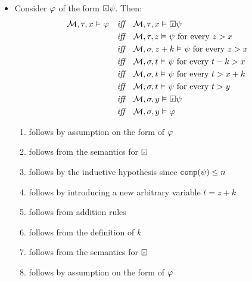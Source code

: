 \documentclass[a4paper, 11pt]{article}                  %
\begin{document}
\begin{enumerate}
{\begin{itemize}
          \item Consider $\varphi$ of the form $\Future\metaB$. Then:
          \setcounter{equation}{0}
          \begin{align}
            \M, \tau, x \MLmodels \metaA \quad \textit{iff}\quad & \M, \tau, x \MLmodels \Future\metaB\\
            \textit{iff}\quad & \M, \tau, z \MLmodels \metaB \text{ for every } z > x\\
            \textit{iff}\quad & \M, \sigma, z+k \MLmodels \metaB \text{ for every } z > x\\
            \textit{iff}\quad & \M, \sigma, t \MLmodels \metaB \text{ for every } t - k > x\\
            \textit{iff}\quad & \M, \sigma, t \MLmodels \metaB \text{ for every } t > x + k\\
            \textit{iff}\quad & \M, \sigma, t \MLmodels \metaB \text{ for every } t > y\\
            \textit{iff}\quad & \M, \sigma, y \MLmodels \Future\metaB\\
            \textit{iff}\quad & \M, \sigma, y \MLmodels \metaA
          \end{align}
          \begin{enumerate}[label=(\arabic*)]
            \item follows by assumption on the form of $\varphi$
            \item follows from the semantics for $\Future$
            \item follows by the inductive hypothesis since $\texttt{comp}(\psi) \le n$
            \item follows by introducing a new arbitrary variable $t = z + k$
            \item follows from addition rules
            \item follows from the definition of $k$
            \item follows from the semantics for $\Future$
            \item follows by assumption on the form of $\varphi$
          \end{enumerate}


\end{itemize}}
\end{enumerate}
\end{document}

